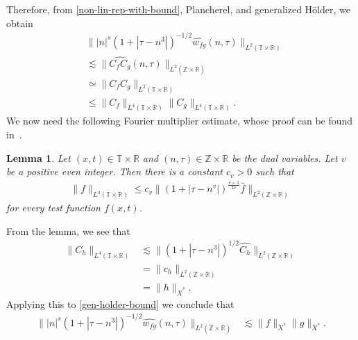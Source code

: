 \documentclass[12pt,reqno]{amsart}
\numberwithin{equation}{section}  %
\numberwithin{figure}{section}
\newcommand{\rr}{\mathbb{R}}
\newcommand{\zz}{\mathbb{Z}}
\newcommand{\ci}{\mathbb{T}}
\newcommand{\zzdot}{\dot{\zz}}
\newcommand{\wh}{\widehat}
\theoremstyle{plain}
\newtheorem{lemma}{Lemma}
\theoremstyle{definition}
\theoremstyle{remark}
\begin{document}
%
%
Therefore, from \eqref{non-lin-rep-with-bound}, Plancherel, and generalized 
H\"{o}lder, we obtain
%
%
\begin{equation}
	\label{gen-holder-bound}
	\begin{split}
		& \| |n|^s \left( 1 + | \tau - n^3 | \right )^{-1/2}  \wh{w_{fg}}\left( 
		n, \tau \right) \|_{L^2(\ci \times \rr)}
		\\
		& \lesssim \|\wh{C_f C_g }\left( n, \tau \right) 
		\|_{L^2\left( \zzdot \times \rr \right)}
		\\
		& \simeq \|C_f C_g \|_{L^2\left( \ci \times \rr \right)}
		\\
		& \le \|C_f \|_{L^4(\ci \times \rr)} \|C_g \|_{L^4(\ci \times \rr)}.
	\end{split}
\end{equation}
%
We now need the following Fourier multiplier estimate, whose proof can be found
in~\cite{Himonas-Misiolek-2001-A-priori-estimates-for-Schrodinger}.
%
\begin{lemma}
	\label{lem:four-mult-est-L4}
	Let $(x, t) \in \ci \times \rr $ and $(n, \tau) \in \zz \times \rr$ be 
	the dual variables. Let $v$ be a positive even integer. Then there is a 
	constant $c_v > 0$ such that
%
%
\begin{equation}
	\label{four-mult-est-L4}
	\begin{split}
		\|f\|_{L^4(\ci \times \rr)} \le c_v \|\left( 1 + | \tau - n^v | 
		\right)^\frac{v+1}{4v} \wh{f} \|_{L^2( \zz \times \rr)}
	\end{split}
\end{equation}
for every test function $f(x, t)$. 
%
%
%
%
\end{lemma}
From the lemma, we see that
%
%
\begin{equation}
	\label{four-mult-conseq}
	\begin{split}
		\|C_h\|_{L^4(\ci \times \rr)} 
		& \lesssim \|(1 + | \tau - n^3 |)^{1/2} \wh{C_h}
		\|_{L^2(\zz \times \rr)}
		\\
		& = \|c_{h} \|_{L^2(\zz \times \rr)} 
		\\
		& = \|h \|_{\dot{X}^s}. 
	\end{split}
\end{equation}
%
%
Applying this to \eqref{gen-holder-bound} we
conclude that
\begin{equation*}
	\begin{split}
		\| |n|^s \left( 1 + | \tau - n^3 | \right ) ^{-1/2} \wh{w_{fg}}\left( 
		n, \tau \right) \|_{L^2(\zzdot \times \rr)}
		& \lesssim \|f\|_{\dot{X}^s} \|g\|_{\dot{X}^s}.
	\end{split}
\end{equation*}
%
%
%
\end{document}
